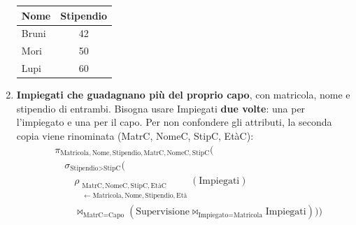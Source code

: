 \documentclass[12pt]{extarticle}
\begin{document}
\begin{enumerate}
\begin{center}
    \medskip
    \small
    \begin{tabular}{lc}
        \toprule
        \textbf{Nome} & \textbf{Stipendio} \\
        \midrule
        Bruni & 42 \\
        Mori & 50 \\
        Lupi & 60 \\
        \bottomrule
    \end{tabular}
    \end{center}

    \item \textbf{Impiegati che guadagnano più del proprio capo}, con matricola, nome e stipendio di entrambi. Bisogna usare Impiegati \textbf{due volte}: una per l'impiegato e una per il capo. Per non confondere gli attributi, la seconda copia viene rinominata (MatrC, NomeC, StipC, EtàC):
    \[
    \begin{aligned}
    & \pi_{\text{Matricola}, \text{Nome}, \text{Stipendio}, \text{MatrC}, \text{NomeC}, \text{StipC}}\Big( \\
    & \quad \sigma_{\text{Stipendio} > \text{StipC}}\Big( \\
    & \qquad \rho_{\substack{\text{MatrC}, \text{NomeC}, \text{StipC}, \text{EtàC} \\ \leftarrow \text{Matricola}, \text{Nome}, \text{Stipendio}, \text{Età}}}(\text{Impiegati}) \\
    & \qquad \bowtie_{\text{MatrC} = \text{Capo}} (\text{Supervisione} \bowtie_{\text{Impiegato} = \text{Matricola}} \text{Impiegati})
    \Big)\Big)
    \end{aligned}
    \]
    \begin{center}


\end{center}
\end{enumerate}
\end{document}
